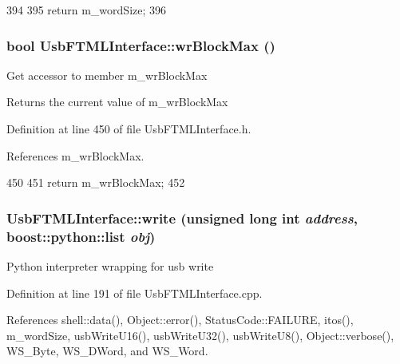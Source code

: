 \begin{DoxyCode}
394                             {
395     return m_wordSize;
396   }  
\end{DoxyCode}
\hypertarget{classUsbFTMLInterface_a296da37a9d4c2d78338800ebc283bb80}{
\subsubsection[{wrBlockMax}]{\setlength{\rightskip}{0pt plus 5cm}bool UsbFTMLInterface::wrBlockMax ()}}
\label{classUsbFTMLInterface_a296da37a9d4c2d78338800ebc283bb80}
Get accessor to member m\_\-wrBlockMax \begin{DoxyReturn}{Returns}
the current value of m\_\-wrBlockMax 
\end{DoxyReturn}


Definition at line 450 of file UsbFTMLInterface.h.

References m\_\-wrBlockMax.


\begin{DoxyCode}
450                      {
451     return m_wrBlockMax;
452   }
\end{DoxyCode}
\hypertarget{classUsbFTMLInterface_a151203f73f3e052a20ffc5809f2d6318}{
\subsubsection[{write}]{ UsbFTMLInterface::write (unsigned long int {\em address}, \/  boost::python::list {\em obj})}}
\label{classUsbFTMLInterface_a151203f73f3e052a20ffc5809f2d6318}
Python interpreter wrapping for usb write 

Definition at line 191 of file UsbFTMLInterface.cpp.

References shell::data(), Object::error(), StatusCode::FAILURE, itos(), m\_\-wordSize, usbWriteU16(), usbWriteU32(), usbWriteU8(), Object::verbose(), WS\_\-Byte, WS\_\-DWord, and WS\_\-Word.


